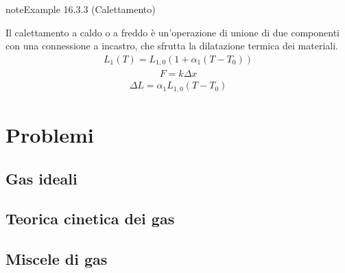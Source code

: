 \documentclass[letterpaper,10pt,italian]{jupyterBook}
\begin{document}
\begin{sphinxadmonition}{note}{Example 16.3.3 (Calettamento)}



\sphinxAtStartPar
Il calettamento a caldo o a freddo è un’operazione di unione di due componenti con una connessione a incastro, che sfrutta la dilatazione termica dei materiali.  
\begin{equation*}
\begin{split}L_1(T) = L_{1,0} (1 + \alpha_1 (T-T_0))\end{split}
\end{equation*}\begin{equation*}
\begin{split}F = k \Delta x\end{split}
\end{equation*}\begin{equation*}
\begin{split}\Delta L = \alpha_1 L_{1,0} ( T - T_0 )\end{split}
\end{equation*}\end{sphinxadmonition}

\sphinxstepscope


\section{Problemi}
\label{\detokenize{ch/thermodynamics/matter-problems:problemi}}\label{\detokenize{ch/thermodynamics/matter-problems:physics-hs-thermodynamics-matter-problems}}\label{\detokenize{ch/thermodynamics/matter-problems::doc}}

\subsection{Gas ideali}
\label{\detokenize{ch/thermodynamics/matter-problems:gas-ideali}}

\subsection{Teorica cinetica dei gas}
\label{\detokenize{ch/thermodynamics/matter-problems:teorica-cinetica-dei-gas}}

\subsection{Miscele di gas}
\label{\detokenize{ch/thermodynamics/matter-problems:miscele-di-gas}}
\end{document}
